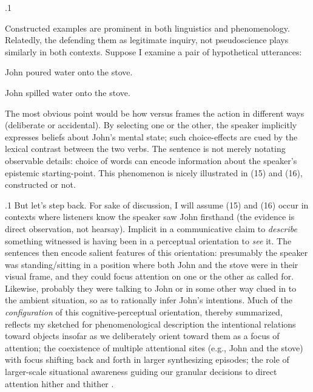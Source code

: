 \documentclass[11pt, twocolumn]{article}
\begin{document}
\p.1{%
\:\+Constructed examples are prominent in both linguistics
and phenomenology. \>  Relatedly, the 
\mdash{} defending them as legitimate inquiry, not pseudoscience
\mdash{} plays similarly in both contexts. \>  Suppose I examine a
pair of hypothetical utterances:

\begin{exsGroup}

\exsItem{}  \>  John poured water onto the stove. {\sssm}

\exsItem{}  \>  John spilled water onto the stove. \> 

\end{exsGroup}

\nip{}%
The most obvious point would be how  versus  frames the
action in different ways (deliberate or accidental). \>  By selecting
one or the other, the speaker implicitly expresses beliefs about
John's mental state; such choice-effects are cued by the lexical contrast
between the two verbs. \>  The
sentence is not merely notating observable details: choice of words can
encode information about the speaker's
epistemic starting-point. \>  This phenomenon
is nicely illustrated in \exsRef(15) and \exsRef(16), constructed or not.\<\;
}%

\p.1{%
\:\+But let's step back. \>  For sake of discussion, I will assume \exsRef(15) and \exsRef(16)
occur in contexts where listeners know the speaker saw John firsthand
(the evidence is direct observation, not hearsay). \>  Implicit
in a communicative claim to \textit{describe} something witnessed
is having been in a perceptual orientation to \textit{see} it. \>  The
sentences then encode salient features of this orientation:
presumably the speaker was standing/sitting in a position
where both John and the stove were in their visual frame,
and they could focus attention on one or the other as
called for. \>  Likewise, probably they were talking to
John or in some other way clued in to the ambient situation, so
as to rationally infer John's intentions. \>  Much of the
\textit{configuration} of this cognitive-perceptual orientation,
thereby summarized, reflects my sketched 
for phenomenological description \mdash{} the intentional relations toward
objects insofar as we deliberately orient toward them
as a focus of attention; the coexistence of multiple
attentional sites (e.g., John and the stove) with focus
shifting back and forth in larger synthesizing episodes;
the role of larger-scale situational awareness guiding
our granular decisions to direct attention hither and
thither .\<\;
}%
\end{document}
